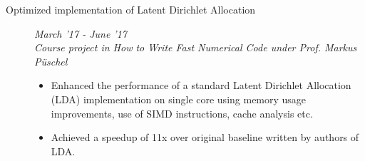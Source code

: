 \documentclass[9pt]{article}
\newenvironment{changemargin}[2]{%
  \begin{list}{}{%
    \setlength{\topsep}{0pt}%
    \setlength{\leftmargin}{#1}%
    \setlength{\rightmargin}{#2}%
    \setlength{\listparindent}{\parindent}%
    \setlength{\itemindent}{\parindent}%
    \setlength{\parsep}{\parskip}%
  }%
  \item[]}{\end{list}
}
\newenvironment{body} {
	\vspace*{-16pt}
	\begin{changemargin}{-0.6in}{-0.65in}
  }	
	{\end{changemargin}
}
\begin{document}
\begin{body}
\begin{description}
	\item[\normalsize{Optimized implementation of Latent Dirichlet Allocation}]
	\hfill \textit{March '17 - June '17} \\
	\textit{Course project in How to Write Fast Numerical Code under Prof. Markus P{\"u}schel}
	\begin{itemize}
		\item Enhanced the performance of a standard Latent Dirichlet Allocation (LDA)
		implementation on single core using memory usage improvements, use of SIMD instructions, cache analysis etc.
		\item Achieved a speedup of 11x over original baseline written by authors of LDA.
	\end{itemize}
      



\end{description}
\end{body}
\end{document}
